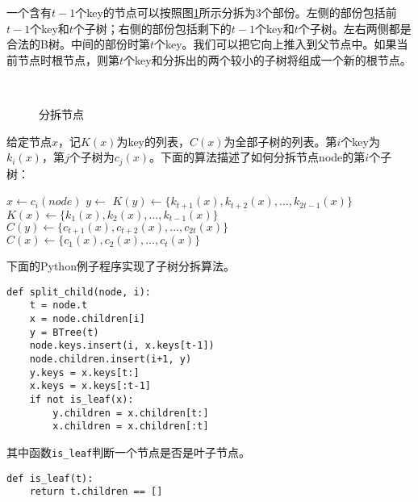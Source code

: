 \documentclass[UTF8]{article}
\begin{document}
一个含有$t-1$个key的节点可以按照图\ref{fig:node-split}所示分拆为3个部份。左侧的部份包括前$t-1$个key和$t$个子树；右侧的部份包括剩下的$t-1$个key和$t$个子树。左右两侧都是合法的B树。中间的部份时第$t$个key。我们可以把它向上推入到父节点中。如果当前节点时根节点，则第$t$个key和分拆出的两个较小的子树将组成一个新的根节点。

\begin{figure}[htbp]
  \centering
   \\
  \caption{分拆节点}
  \label{fig:node-split}
\end{figure}

给定节点$x$，记$K(x)$为key的列表，$C(x)$为全部子树的列表。第$i$个key为$k_i(x)$，第$j$个子树为$c_j(x)$。下面的算法描述了如何分拆节点node的第$i$个子树：

\begin{algorithmic}[1]
  \State $x \gets c_i(node)$
  \State $y \gets$ 
  \State {}
  \State {}
  \State $K(y) \gets \{k_{t+1}(x), k_{t+2}(x), ..., k_{2t-1}(x)\}$
  \State $K(x) \gets \{k_1(x), k_2(x), ..., k_{t-1}(x)\}$
    \State $C(y) \gets \{c_{t+1}(x), c_{t+2}(x), ..., c_{2t}(x)\}$
    \State $C(x) \gets \{c_1(x), c_2(x), ..., c_t(x)\}$
  \EndIf
\EndProcedure
\end{algorithmic}

下面的Python例子程序实现了子树分拆算法。

\lstset{language=Python}
\begin{lstlisting}
def split_child(node, i):
    t = node.t
    x = node.children[i]
    y = BTree(t)
    node.keys.insert(i, x.keys[t-1])
    node.children.insert(i+1, y)
    y.keys = x.keys[t:]
    x.keys = x.keys[:t-1]
    if not is_leaf(x):
        y.children = x.children[t:]
        x.children = x.children[:t]
\end{lstlisting}

其中函数\texttt{is\_leaf}判断一个节点是否是叶子节点。

\lstset{language=Python}
\begin{lstlisting}
def is_leaf(t):
    return t.children == []
\end{lstlisting}

\end{document}
